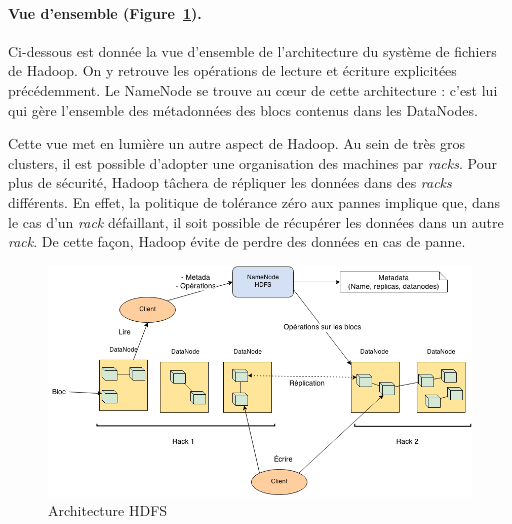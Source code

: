 \paragraph{Vue d'ensemble (Figure~\ref{fig:archi-hdfs}).} Ci-dessous est donnée la vue d'ensemble de l'architecture du système de fichiers de Hadoop. On y retrouve les opérations de lecture et écriture explicitées précédemment. Le NameNode se trouve au c\oe{}ur de cette architecture : c'est lui qui gère l'ensemble des métadonnées des blocs contenus dans les DataNodes.

\par Cette vue met en lumière un autre aspect de Hadoop. Au sein de très gros clusters, il est possible d'adopter une organisation des machines par \textit{racks}. Pour plus de sécurité, Hadoop tâchera de répliquer les données dans des \textit{racks} différents. En effet, la politique de tolérance zéro aux pannes implique que, dans le cas d'un \textit{rack} défaillant, il soit possible de récupérer les données dans un autre \textit{rack}. De cette façon, Hadoop évite de perdre des données en cas de panne.

\begin{figure}[ht!]
  \centering
  \includegraphics[width=16cm]{images/hadoop_arch.png}
  \caption{Architecture HDFS}
  \label{fig:archi-hdfs}
\end{figure}

